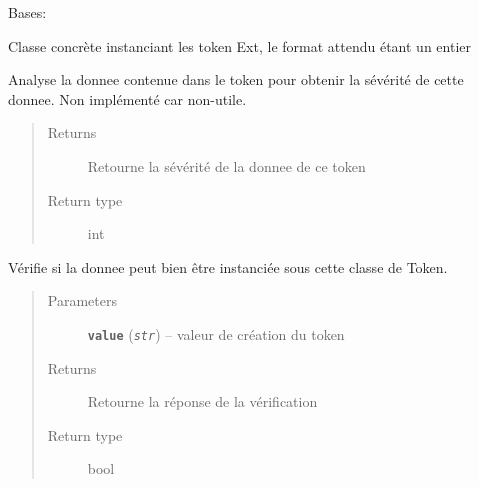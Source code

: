 \documentclass[letterpaper,10pt,english]{sphinxmanual}
\begin{document}

\begin{fulllineitems}
\label{loganalyser:loganalyser.token.EXT}
Bases: {\hyperref[loganalyser:loganalyser.token.Token]{\emph{}}}

Classe concrète instanciant les token Ext, le format attendu étant un entier

\begin{fulllineitems}
\label{loganalyser:loganalyser.token.EXT._Token__analyse}
Analyse la donnee contenue dans le token pour obtenir la sévérité de cette donnee. Non implémenté car non-utile.
\begin{quote}\begin{description}
\item[{Returns}] \leavevmode
Retourne la sévérité de la donnee de ce token

\item[{Return type}] \leavevmode
int

\end{description}\end{quote}

\end{fulllineitems}


\begin{fulllineitems}
\label{loganalyser:loganalyser.token.EXT._Token__verifier_type}
Vérifie si la donnee peut bien être instanciée sous cette classe de Token.
\begin{quote}\begin{description}
\item[{Parameters}] \leavevmode
\textbf{\texttt{value}} (\emph{\texttt{str}}) -- valeur de création du token

\item[{Returns}] \leavevmode
Retourne la réponse de la vérification

\item[{Return type}] \leavevmode
bool

\end{description}\end{quote}

\end{fulllineitems}


\end{fulllineitems}
\end{document}
